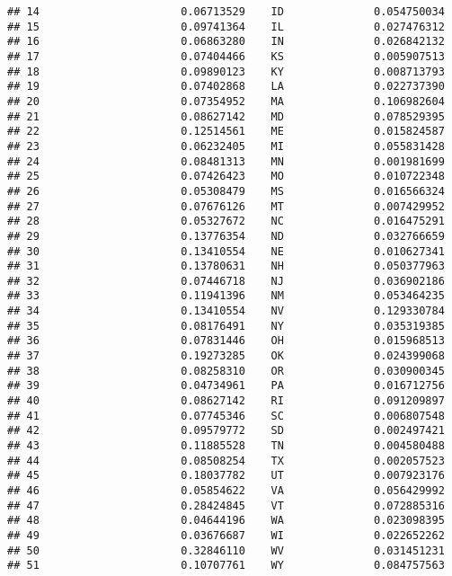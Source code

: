\documentclass{article}\usepackage[]{graphicx}\usepackage[]{color}
\makeatletter
\newenvironment{kframe}{%
 \def\at@end@of@kframe{}%
 \ifinner\ifhmode%
  \def\at@end@of@kframe{\end{minipage}}%
  \begin{minipage}{\columnwidth}%
 \fi\fi%
 \def\FrameCommand##1{\hskip\@totalleftmargin \hskip-\fboxsep
 \colorbox{shadecolor}{##1}\hskip-\fboxsep
     \hskip-\linewidth \hskip-\@totalleftmargin \hskip\columnwidth}%
 \MakeFramed {\advance\hsize-\width
   \@totalleftmargin\z@ \linewidth\hsize
   \@setminipage}}%
 {\par\unskip\endMakeFramed%
 \at@end@of@kframe}
\newenvironment{knitrout}{}{} %
\makeatother
\begin{document}
\begin{knitrout}
\begin{kframe}
\begin{verbatim}
## 14                      0.06713529    ID              0.054750034
## 15                      0.09741364    IL              0.027476312
## 16                      0.06863280    IN              0.026842132
## 17                      0.07404466    KS              0.005907513
## 18                      0.09890123    KY              0.008713793
## 19                      0.07402868    LA              0.022737390
## 20                      0.07354952    MA              0.106982604
## 21                      0.08627142    MD              0.078529395
## 22                      0.12514561    ME              0.015824587
## 23                      0.06232405    MI              0.055831428
## 24                      0.08481313    MN              0.001981699
## 25                      0.07426423    MO              0.010722348
## 26                      0.05308479    MS              0.016566324
## 27                      0.07676126    MT              0.007429952
## 28                      0.05327672    NC              0.016475291
## 29                      0.13776354    ND              0.032766659
## 30                      0.13410554    NE              0.010627341
## 31                      0.13780631    NH              0.050377963
## 32                      0.07446718    NJ              0.036902186
## 33                      0.11941396    NM              0.053464235
## 34                      0.13410554    NV              0.129330784
## 35                      0.08176491    NY              0.035319385
## 36                      0.07831446    OH              0.015968513
## 37                      0.19273285    OK              0.024399068
## 38                      0.08258310    OR              0.030900345
## 39                      0.04734961    PA              0.016712756
## 40                      0.08627142    RI              0.091209897
## 41                      0.07745346    SC              0.006807548
## 42                      0.09579772    SD              0.002497421
## 43                      0.11885528    TN              0.004580488
## 44                      0.08508254    TX              0.002057523
## 45                      0.18037782    UT              0.007923176
## 46                      0.05854622    VA              0.056429992
## 47                      0.28424845    VT              0.072885316
## 48                      0.04644196    WA              0.023098395
## 49                      0.03676687    WI              0.022652262
## 50                      0.32846110    WV              0.031451231
## 51                      0.10707761    WY              0.084757563

\end{verbatim}
\end{kframe}
\end{knitrout}
\end{document}
